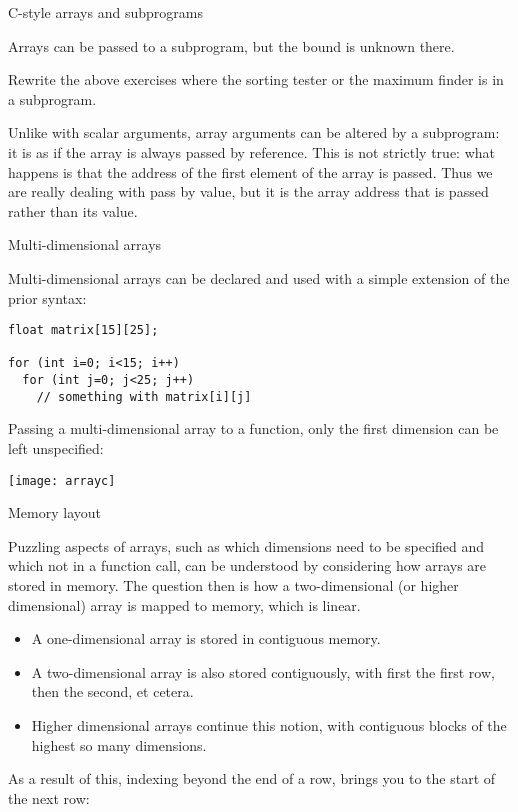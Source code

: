  {C-style arrays and subprograms}

Arrays can be passed to a subprogram, but the bound is unknown there.
%
%
\begin{exercise}
  Rewrite the above exercises where the sorting tester or the maximum
  finder is in a subprogram.
\end{exercise}

Unlike with scalar arguments, array arguments can be altered by a
subprogram: it is as if the array is always passed by reference. This is
not strictly true: what happens is that the address of the first
element of the array is passed. Thus we are really dealing with pass
by value, but it is the array address that is passed rather than its value.

 {Multi-dimensional arrays}

Multi-dimensional arrays can be declared and used with a simple extension of
the prior syntax:
\begin{verbatim}
float matrix[15][25];

for (int i=0; i<15; i++)
  for (int j=0; j<25; j++)
    // something with matrix[i][j]
\end{verbatim}

Passing a multi-dimensional array to a function, only the first
dimension can be left unspecified:
%

\texttt{[image: arrayc]}

 {Memory layout}

Puzzling aspects of arrays, such as which dimensions need to be
specified and which not in a function call, can be understood by
considering how arrays are stored in memory.
The question then is how a two-dimensional (or higher dimensional)
array is mapped to memory, which is linear.
\begin{itemize}
\item A one-dimensional array is stored in contiguous memory.
\item A two-dimensional array is also stored contiguously, with first
  the first row, then the second, et cetera.
\item Higher dimensional arrays continue this notion, with contiguous
  blocks of the highest so many dimensions.
\end{itemize}

As a result of this, indexing beyond the end of a row, brings you to the
start of the next row:
%

